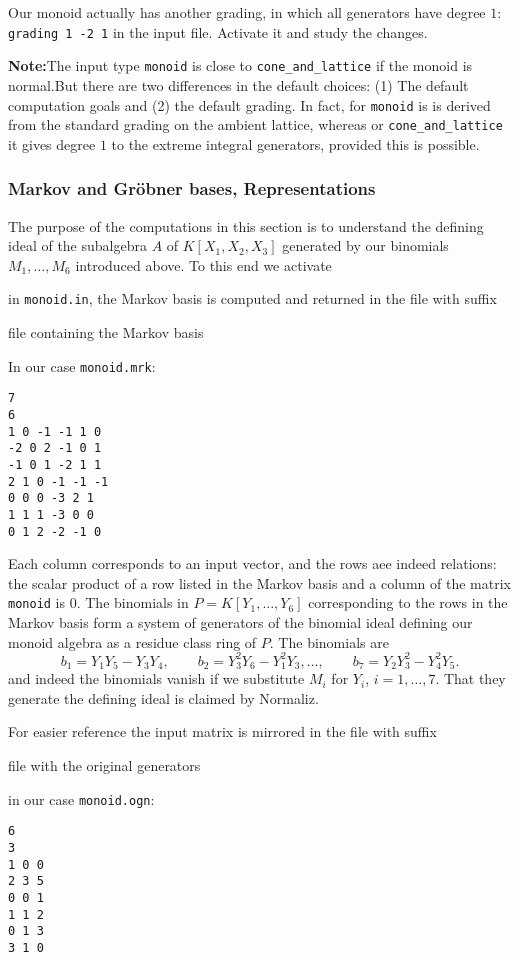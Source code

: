 Our monoid actually has another grading, in which all generators have degree $1$: \verb|grading 1 -2 1| in the input file. Activate it and study the changes.

\textbf{Note:}\enspace The input type \verb|monoid| is close to \verb|cone_and_lattice| if the monoid is normal.But there are two differences in the default choices: (1) The default computation goals and (2) the default grading. In fact, for \verb|monoid| is is derived from the standard grading on the ambient lattice, whereas or \verb|cone_and_lattice| it gives degree $1$ to the extreme integral generators, provided this is possible.

\subsubsection{Markov and Gröbner bases, Representations}\label{markov}
The purpose of the computations in this section is to understand the defining ideal of the subalgebra $A$ of $K[X_1,X_2,X_3]$ generated by our binomials $M_1,\dots,M_6$ introduced above. To this end we activate
\begin{itemize}
	\itemtt[MarkovBasis]
\end{itemize}
in \verb|monoid.in|, the Markov basis is computed and returned in the file with suffix 
\begin{itemize}
	\itemtt[mrk] file containing the Markov basis	
\end{itemize}
In our case \verb|monoid.mrk|:
\begin{Verbatim}
7
6
1 0 -1 -1 1 0 
-2 0 2 -1 0 1 
-1 0 1 -2 1 1 
2 1 0 -1 -1 -1 
0 0 0 -3 2 1 
1 1 1 -3 0 0 
0 1 2 -2 -1 0
\end{Verbatim}
Each column corresponds to an input vector, and the rows aee indeed relations: the scalar product of a row listed in the Markov basis and a column of the matrix \verb|monoid| is $0$. The binomials in $P=K[Y_1,\dots,Y_6]$ corresponding to the rows in the Markov basis form a system of generators of the binomial ideal defining our monoid algebra as a residue class ring of $P$. The binomials are
$$
b_1 = Y_1Y_5 - Y_3Y_4, \qquad b_2 = Y_3^2Y_6 - Y_1^2Y_3,\dots,\qquad b_7 = Y_2Y_3^2 - Y_4^2Y_5.
$$
and indeed the binomials vanish if we substitute $M_i$ for $Y_i$, $i=1,\dots,7$. That they generate the defining ideal is claimed by Normaliz.

For easier reference the input matrix is mirrored in the file with suffix 
\begin{itemize}
	\itemtt[ogn] file with the original generators
\end{itemize}
in our case \verb|monoid.ogn|:
\begin{Verbatim}
6
3
1 0 0 
2 3 5 
0 0 1 
1 1 2 
0 1 3 
3 1 0
\end{Verbatim}

